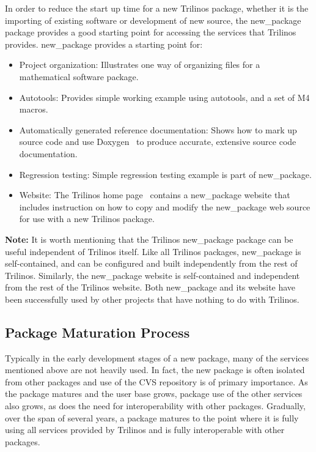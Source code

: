 \documentclass[12pt,relax]{TPA}
\begin{document}
In order to reduce the start up time for a new Trilinos package,
whether it is the importing of existing software or development of new
source, the new\_package package provides a good starting point for
accessing the services that Trilinos provides.
new\_package provides a
starting point for:
\begin{itemize}
\item Project organization:  Illustrates one way of
organizing files for a mathematical software package.
\item Autotools: Provides simple working example
using autotools, and a set of M4 macros.
\item Automatically generated reference documentation: Shows how
to mark up source code and use Doxygen~\cite{Doxygen} to produce
accurate, extensive source code documentation.
\item Regression testing: Simple regression testing example is part of
new\_package.
\item Website: The Trilinos home page~\cite{Trilinos-home-page}
contains a new\_package website that includes instruction on how to
copy and modify the new\_package web source for use with a new
Trilinos package.
\end{itemize}

{\bf Note:} It is worth mentioning that the Trilinos new\_package package can be
useful independent of Trilinos itself.  Like all Trilinos packages,
new\_package is self-contained, and can be configured and
built independently from the rest of Trilinos.  Similarly, the
new\_package website is self-contained and independent
from the rest of the Trilinos website.  Both new\_package and its
website have been successfully used by other projects that have nothing to do with Trilinos.

\subsection{Package Maturation Process}
Typically in the early development
stages of a new package, many of the services mentioned above are not
heavily used. In fact, the new package is often isolated from other
packages and use of the CVS repository is of primary importance.
As the package
matures and the user base grows, package use of the other services
also grows, as does the need for interoperability with other
packages.  Gradually, over the span of several years, a package
matures to the point where it is fully using all services provided by
Trilinos and is fully interoperable with other packages.
\end{document}
